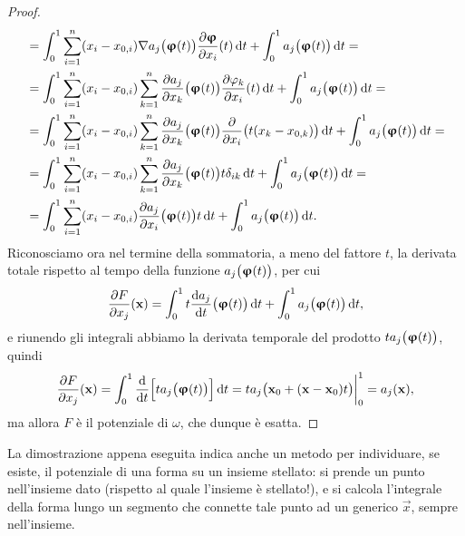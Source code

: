 \begin{proof}
\begin{equation}
\begin{split}
			&=\int_0^1\sum_{i=1}^n(x_i-x_{0,i})\nabla a_j\big(\bm{\upvarphi}(t)\big)\frac{\partial {\bm{\upvarphi}}}{\partial {x_i}}(t)\,\textup{d} t+\int_0^1a_j\big(\bm{\upvarphi}(t)\big)\,\textup{d} t=\\
			&=\int_0^1\sum_{i=1}^n(x_i-x_{0,i})\sum_{k=1}^n\frac{\partial {a_j}}{\partial {x_k}}\big(\bm{\upvarphi}(t)\big)\frac{\partial {\varphi_k}}{\partial {x_i}}(t)\,\textup{d} t+\int_0^1a_j\big(\bm{\upvarphi}(t)\big)\,\textup{d} t=\\
			&=\int_0^1\sum_{i=1}^n(x_i-x_{0,i})\sum_{k=1}^n\frac{\partial {a_j}}{\partial {x_k}}\big(\bm{\upvarphi}(t)\big)\frac{\partial {}}{\partial {x_i}}\big(t(x_k-x_{0,k})\big)\,\textup{d} t+\int_0^1a_j\big(\bm{\upvarphi}(t)\big)\,\textup{d} t=\\
			&=\int_0^1\sum_{i=1}^n(x_i-x_{0,i})\sum_{k=1}^n\frac{\partial {a_j}}{\partial {x_k}}\big(\bm{\upvarphi}(t)\big)t\delta_{ik}\,\textup{d} t+\int_0^1a_j\big(\bm{\upvarphi}(t)\big)\,\textup{d} t=\\
			&=\int_0^1\sum_{i=1}^n(x_i-x_{0,i})\frac{\partial {a_j}}{\partial {x_i}}\big(\bm{\upvarphi}(t)\big)t\,\textup{d} t+\int_0^1a_j\big(\bm{\upvarphi}(t)\big)\,\textup{d} t.
		\end{split}
	\end{equation}
	Riconosciamo ora nel termine della sommatoria, a meno del fattore $t$, la derivata totale rispetto al tempo della funzione $a_j\big(\bm{\upvarphi}(t)\big)$, per cui
	\begin{equation}
		\frac{\partial {F}}{\partial {x_j}}(\mathbf{x})=\int_0^1t\frac{\textup{d} {a_j}}{\textup{d} {t}}\big(\bm{\upvarphi}(t)\big)\,\textup{d} t+\int_0^1a_j\big(\bm{\upvarphi}(t)\big)\,\textup{d} t,
	\end{equation}
	e riunendo gli integrali abbiamo la derivata temporale del prodotto $ta_j\big(\bm{\upvarphi}(t)\big)$, quindi
	\begin{equation}
		\frac{\partial {F}}{\partial {x_j}}(\mathbf{x})=\int_0^1\frac{\textup{d} {}}{\textup{d} {t}}\Big[ta_j\big(\bm{\upvarphi}(t)\big)\Big]\,\textup{d} t=ta_j\big(\mathbf{x}_0+(\mathbf{x}-\mathbf{x}_0)t\big)\bigg|_0^1=a_j(\mathbf{x}),
	\end{equation}
	ma allora $F$ è il potenziale di $\omega$, che dunque è esatta.
\end{proof}
La dimostrazione appena eseguita indica anche un metodo per individuare, se esiste, il potenziale di una forma su un insieme stellato: si prende un punto nell'insieme dato (rispetto al quale l'insieme è stellato!), e si calcola l'integrale della forma lungo un segmento che connette tale punto ad un generico $\vec x$, sempre nell'insieme.

